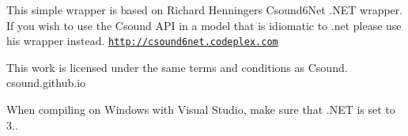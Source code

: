 This simple wrapper is based on Richard Henninger\textquotesingle{}s Csound6\+Net .N\+E\+T wrapper. If you wish to use the Csound A\+P\+I in a model that is idiomatic to .net please use his wrapper instead. \href{http://csound6net.codeplex.com}{\tt http\+://csound6net.\+codeplex.\+com}

This work is licensed under the same terms and conditions as Csound. csound.\+github.\+io

When compiling on Windows with Visual Studio, make sure that .N\+E\+T is set to 3.. 